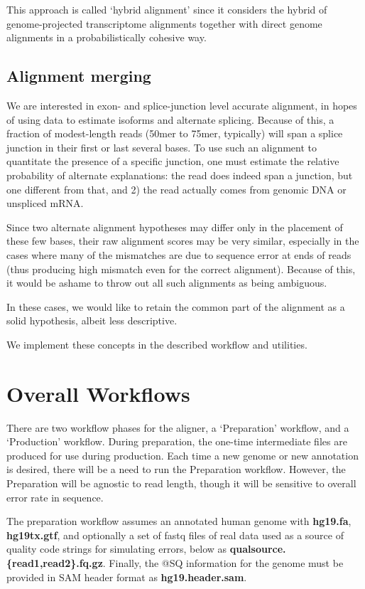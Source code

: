 \documentclass[10pt]{article}
\begin{document}
This approach is called `hybrid alignment' since it considers the
hybrid of genome-projected transcriptome alignments together with
direct genome alignments in a probabilistically cohesive way.

\subsection*{Alignment merging}

We are interested in exon- and splice-junction level accurate
alignment, in hopes of using data to estimate isoforms and alternate
splicing. Because of this, a fraction of modest-length reads (50mer to
75mer, typically) will span a splice junction in their first or last
several bases. To use such an alignment to quantitate the presence of
a specific junction, one must estimate the relative probability of
alternate explanations: the read does indeed span a junction, but one
different from that, and 2) the read actually comes from genomic DNA
or unspliced mRNA.

Since two alternate alignment hypotheses may differ only in the
placement of these few bases, their raw alignment scores may be very
similar, especially in the cases where many of the mismatches are due
to sequence error at ends of reads (thus producing high mismatch even
for the correct alignment). Because of this, it would be ashame to
throw out all such alignments as being ambiguous.

In these cases, we would like to retain the common part of the
alignment as a solid hypothesis, albeit less descriptive.

We implement these concepts in the described workflow and utilities.

\section{Overall Workflows}
There are two workflow phases for the aligner, a `Preparation'
workflow, and a `Production' workflow.  During preparation, the
one-time intermediate files are produced for use during
production. Each time a new genome or new annotation is desired, there
will be a need to run the Preparation workflow. However, the
Preparation will be agnostic to read length, though it will be
sensitive to overall error rate in sequence.

The preparation workflow assumes an annotated human genome with
\textbf{hg19.fa}, \textbf{hg19tx.gtf}, and optionally a set of fastq
files of real data used as a source of quality code strings for
simulating errors, below as
\textbf{qualsource.\{read1,read2\}.fq.gz}. Finally, the @SQ
information for the genome must be provided in SAM header format as
\textbf{hg19.header.sam}.
\end{document}
